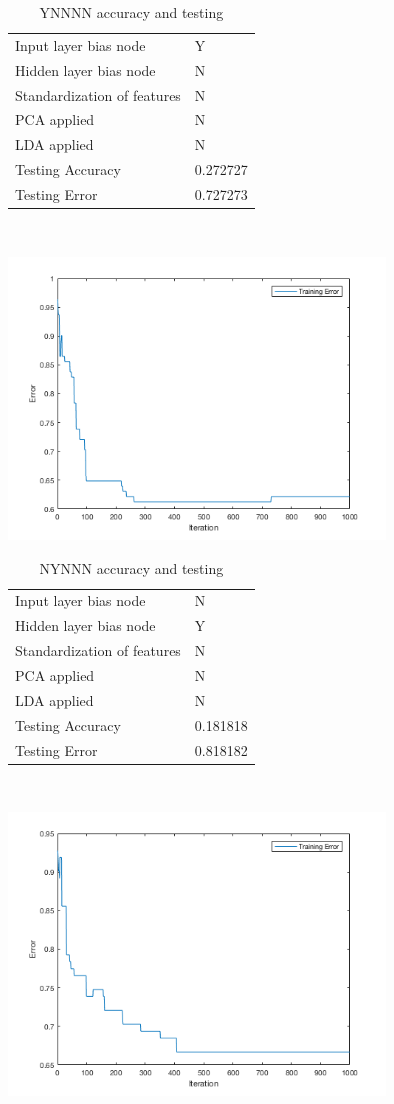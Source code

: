\documentclass[12pt]{article}
\newcommand{\accuracyAndTestErrorTable}[8]{
  \begin{tabular}{l|l}
    \hline
    Input layer bias node & #1 \\
    Hidden layer bias node & #2 \\
    Standardization of features & #3 \\
    PCA applied & #4 \\
    LDA applied & #5 \\
    \hline
    Testing Accuracy & #6 \\
    Testing Error & #7 \\
    \hline
  \end{tabular}
  ~\\[60pt]
  \caption{#8}
}
\begin{document}
\begin{center}
  \begin{table}[H]
    \begin{varwidth}[b]{0.4\linewidth}
      \centering
      \accuracyAndTestErrorTable{Y}{N}{N}{N}{N}{0.272727}{0.727273}{YNNNN accuracy and testing}
      \label{table:YNNNN}
    \end{varwidth}%
    \hfill
    \begin{minipage}[b]{0.6\linewidth}
      \centering
      \includegraphics[width=100mm]{YNNNN_training_error.png}
      \label{fig:YNNNN}
    \end{minipage}
  \end{table}
\end{center}


\begin{center}
  \begin{table}[H]
    \begin{varwidth}[b]{0.4\linewidth}
      \centering
      \accuracyAndTestErrorTable{N}{Y}{N}{N}{N}{0.181818}{0.818182}{NYNNN accuracy and testing}
      \label{table:NYNNN}
    \end{varwidth}%
    \hfill
    \begin{minipage}[b]{0.6\linewidth}
      \centering
      \includegraphics[width=100mm]{NYNNN_training_error.png}
      \label{fig:NYNNN}
    \end{minipage}
  \end{table}
\end{center}
\end{document}
